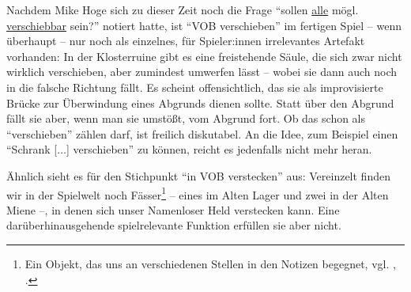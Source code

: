 \documentclass[a5paper,pagesize]{scrbook}
\begin{document}
Nachdem Mike Hoge sich zu dieser Zeit noch die Frage \enquote{sollen \uline{alle} mögl. \uline{verschiebbar} sein?}\autocite[S.~3]{orpheus_interface} notiert hatte, ist \enquote{VOB verschieben} im fertigen Spiel -- wenn überhaupt -- nur noch als einzelnes, für Spieler:innen irrelevantes Artefakt vorhanden:
In der Klosterruine gibt es eine freistehende Säule, die sich zwar nicht wirklich verschieben, aber zumindest umwerfen lässt -- wobei sie dann auch noch in die falsche Richtung fällt.
Es scheint offensichtlich, das sie als improvisierte Brücke zur Überwindung eines Abgrunds dienen sollte.
Statt über den Abgrund fällt sie aber, wenn man sie umstößt, vom Abgrund fort.
Ob das schon als \enquote{verschieben} zählen darf, ist freilich diskutabel.
An die Idee, zum Beispiel einen \enquote{Schrank [$\ldots$] verschieben}\autocite[S.~3]{orpheus_interface} zu können, reicht es jedenfalls nicht mehr heran.

Ähnlich sieht es für den Stichpunkt \enquote{in VOB verstecken} aus:
Vereinzelt finden wir in der Spielwelt noch Fässer\footnote{Ein Objekt, das uns an verschiedenen Stellen in den Notizen begegnet, vgl. \autocite[S.~19]{orpheus_b_scribbles}, \autocite[S.~6]{orpheus_interface}.} -- eines im Alten Lager und zwei in der Alten Miene --, in denen sich unser Namenloser Held verstecken kann.
Eine darüberhinausgehende spielrelevante Funktion erfüllen sie aber nicht.
\end{document}
